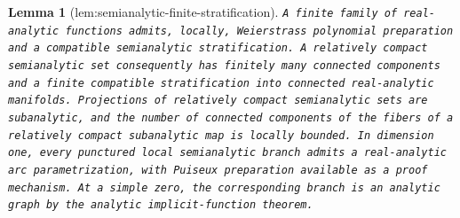 \documentclass{article}
\newtheorem{lemma}{Lemma}
\begin{document}
\begin{lemma}[lem:semianalytic-finite-stratification]\label{lem:semianalytic-finite-stratification}
\texttt{A finite family of real-\allowbreak{}analytic functions admits,\allowbreak{} locally,\allowbreak{} Weierstrass polynomial preparation and a compatible semianalytic stratification. A relatively compact semianalytic set consequently has finitely many connected components and a finite compatible stratification into connected real-\allowbreak{}analytic manifolds. Projections of relatively compact semianalytic sets are subanalytic,\allowbreak{} and the number of connected components of the fibers of a relatively compact subanalytic map is locally bounded. In dimension one,\allowbreak{} every punctured local semianalytic branch admits a real-\allowbreak{}analytic arc parametrization,\allowbreak{} with Puiseux preparation available as a proof mechanism. At a simple zero,\allowbreak{} the corresponding branch is an analytic graph by the analytic implicit-\allowbreak{}function theorem.}
\end{lemma}
\end{document}
